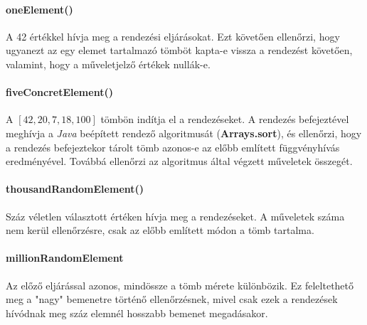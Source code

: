 \documentclass{elteikthesis}
\begin{document}
\paragraph{oneElement()}
A 42 értékkel hívja meg a rendezési eljárásokat. Ezt követően ellenőrzi, hogy ugyanezt az egy elemet tartalmazó tömböt kapta-e vissza a rendezést követően, valamint, hogy a műveletjelző értékek nullák-e.
\paragraph{fiveConcretElement()}
A  $[42, 20, 7, 18, 100]$ tömbön indítja el a rendezéseket. A rendezés befejeztével meghívja a \emph{Java} beépített rendező algoritmusát (\textbf{Arrays.sort}), és ellenőrzi, hogy a rendezés befejeztekor tárolt tömb azonos-e az előbb említett függvényhívás eredményével. Továbbá ellenőrzi az algoritmus által végzett műveletek összegét.
\paragraph{thousandRandomElement()}
Száz véletlen választott értéken hívja meg a rendezéseket. A műveletek száma nem kerül ellenőrzésre, csak az előbb említett módon a tömb tartalma.
\paragraph{millionRandomElement}
Az előző eljárással azonos, mindössze a tömb mérete különbözik. Ez feleltethető meg a "nagy" bemenetre történő ellenőrzésnek, mivel csak ezek a rendezések hívódnak meg száz elemnél hosszabb bemenet megadásakor.
\end{document}
